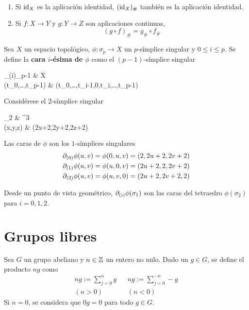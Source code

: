 \begin{proposition}
	\begin{enumerate}
	\item Si $\operatorname{id}_X$ es la aplicación identidad, $(\operatorname{id}_X)_\#$ también es la aplicación identidad.
	\item Si $f\colon X \to Y$ y $g\colon Y \to Z$ son aplicaciones continuas,
		\[(g\circ f)_\#=g_\#\circ f_\#\]
	\end{enumerate}
\end{proposition}

Sea $X$ un espacio topológico, $\phi\colon \sigma_p \to X$ un $p$-símplice singular y $0 \leq i \leq p$.
Se define la \textbf{cara $i$-ésima de $\phi$} como el $(p-1)$-símplice singular
\begin{funcion}
	\p_{(i)}\phi\colon \sigma_{p-1} \arrow[r] & X \\
	{(t_0,\dots,t_{p-1})} \arrow[r, maps to] &
	\phi(t_0,\dots,t_{i-1},0,t_{i},\dots,t_{p-1})
\end{funcion}

\begin{example}
Considérese el 2-símplice singular
\begin{funcion}
	\phi\colon  \sigma_2 \arrow[r] & ^3 \\
	(x,y,z) \arrow[r, maps to] & (2x+2,2y+2,2z+2)
\end{funcion}

Las caras de $\phi$ son los $1$-símplices singulares
\begin{align*}
\partial_{(0)}\phi(u,v)=\phi(0,u,v)=(2,2u+2,2v+2)\\
\partial_{(1)}\phi(u,v)=\phi(u,0,v)=(2u+2,2,2v+2)\\
\partial_{(2)}\phi(u,v)=\phi(u,v,0)=(2u+2,2v+2,2)
\end{align*}

Desde un punto de vista geométrico, $\partial_{(i)}\phi(\sigma_1)$ son las caras del tetraedro $\phi(\sigma_2)$ para $i=0,1,2$.
\end{example}

\section{Grupos libres}
Sea $G$ un grupo abeliano y $n \in \mathbb{Z}$ un entero no nulo.
Dado un $g \in G$, se define el producto $ng$ como
\begin{align*}
ng:=\sum^n_{j=0}g	&& ng:=\sum^{-n}_{j=0}-g\\
(n>0)				&& (n < 0)
\end{align*}
Si $n=0$, se considera que $0g=0$ para todo $g \in G$.

